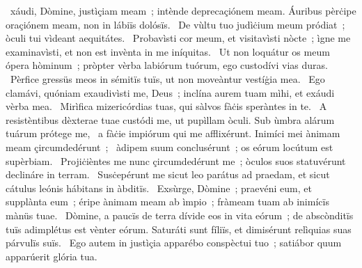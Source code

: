 { }
{%
~xáudi, Dòmine, justìçiam meam~; intènde deprecaçiónem meam. Áuribus pèrċipe oraçiónem meam, non in lábiïs dolósïs. 
~De vùltu tuo judìċium meum pródiat~; òculi tui vìdeant aequitátes. 
~Probavìsti cor meum, et visitavìsti nòcte~; ìgne me examinavìsti, et non est invènta in me iníquitas. 
~Ut non loquátur os meum ópera hòminum~; pròpter vèrba labiórum tuórum, ego custodívi vias duras. 
~Pèrfice gressüs meos in sémitïs tuïs, ut non moveàntur vestíġia mea. 
~Ego clamávi, quóniam exaudivìsti me, Deus~; inclína aurem tuam mìhi, et exáudi vèrba mea. 
~Mirìfica mizericórdias tuas, qui sàlvos fàċis speràntes in te. 
~A resistèntibus dèxterae tuae custódi me, ut pupìllam òculi. Sub ùmbra alárum tuárum prótege me, 
~a fàċie impiórum qui me afflixérunt. Inimíci mei ànimam meam çircumdedérunt~; 
~àdipem suum conclusérunt~; os eórum locútum est supèrbiam. 
~Projiċièntes me nunc çircumdedérunt me~; òculos suos statuvérunt declináre in terram. 
~Susċepérunt me sicut leo parátus ad praedam, et sicut cátulus leónis hábitans in àbditïs. 
~Exsùrge, Dòmine~; praevéni eum, et supplànta eum~; éripe ànimam meam ab ìmpio~; fràmeam tuam ab inimícïs mànüs tuae. 
~Dòmine, a paucïs de terra dívide eos in vita eórum~; de abscònditïs tuïs adimplétus est vènter eórum. Saturáti sunt fíliïs, et dimisérunt relìquias suas párvulïs suïs. 
~Ego autem in justìçia apparébo conspèctui tuo~; satiábor quum apparúerit glória tua. 
}
